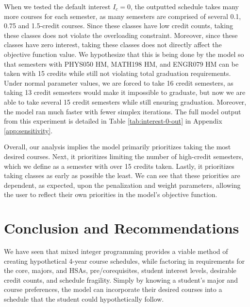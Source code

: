 \documentclass[12pt]{article}
\begin{document}
When we tested the default interest $I_c = 0$, the outputted schedule takes many more courses for each semester, as many semesters are comprised of several 0.1, 0.75 and 1.5-credit courses. Since these classes have low credit counts, taking these classes does not violate the overloading constraint. Moreover, since these classes have zero interest, taking these classes does not directly affect the objective function value. We hypothesize that this is being done by the model so that semesters with PHYS050 HM, MATH198 HM, and ENGR079 HM can be taken with 15 credits while still not violating total graduation requirements. Under normal parameter values, we are forced to take 16 credit semesters, as taking 13 credit semesters would make it impossible to graduate, but now we are able to take several 15 credit semesters while still ensuring graduation. Moreover, the model ran much faster with fewer simplex iterations. The full model output from this experiment is detailed in Table \ref{tab:interest-0-out} in Appendix \ref{app:sensitivity}.

Overall, our analysis implies the model primarily prioritizes taking the most desired courses. Next, it prioritizes limiting the number of high-credit semesters, which we define as a semester with over 15 credits taken. Lastly, it prioritizes taking classes as early as possible the least. We can see that these priorities are dependent, as expected, upon the penalization and weight parameters, allowing the user to reflect their own priorities in the model's objective function. 

\section{Conclusion and Recommendations}\label{sec:conclusion}

We have seen that mixed integer programming provides a viable method of creating hypothetical 4-year course schedules, while factoring in requirements for the core, majors, and HSAs, pre/corequisites, student interest levels, desirable credit counts, and schedule fragility. Simply by knowing a student's major and course preferences, the model can incorporate their desired courses into a schedule that the student could hypothetically follow. 
\end{document}
